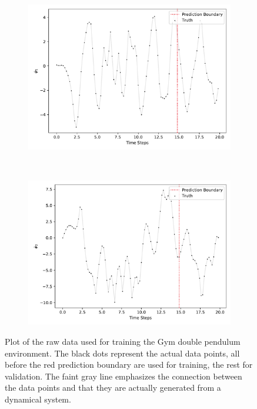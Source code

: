 \begin{figure}
\begin{subfigure}{0.5\linewidth}
				\includegraphics[width=\linewidth]{figures/experiments/environments/observations-acrobot-gym-N0-D4.pdf}
			\end{subfigure}%
			~
			\begin{subfigure}{0.5\linewidth}
				\centering
				\includegraphics[width=\linewidth]{figures/experiments/environments/observations-acrobot-gym-N0-D5.pdf}
			\end{subfigure}
			\caption{Plot of the raw data used for training the Gym double pendulum environment. The black dots represent the actual data points, all before the red prediction boundary are used for training, the rest for validation. The faint gray line emphasizes the connection between the data points and that they are actually generated from a dynamical system.}
			\label{fig:envDoublePendulumGym}
		\end{figure}

